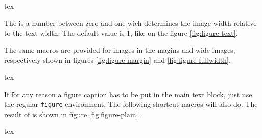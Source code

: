 \begin{codebox}{tex}
\end{codebox}

The  is a number between zero and one wich determines the image width relative to the text width. The default value is 1, like on the figure \ref{fig:figure-text}.

The same macros are provided for images in the magins and wide images, respectively shown in figures \ref{fig:figure-margin} and \ref{fig:figure-fullwidth}.

\begin{codebox}{tex}
\end{codebox}



If for any reason a figure caption has to be put in the main text block, just use the regular \texttt{figure} environment. The following shortcut macros will also do. The result of  is shown in figure \ref{fig:figure-plain}.

\begin{codebox}{tex}
\end{codebox}


